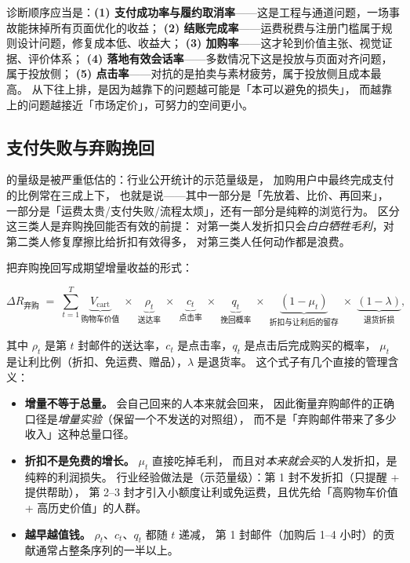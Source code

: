 \begin{keypoint}
诊断顺序应当是：\textbf{(1) 支付成功率与履约取消率}——这是工程与通道问题，一场事故能抹掉所有页面优化的收益；
\textbf{(2) 结账完成率}——运费税费与注册门槛属于规则设计问题，修复成本低、收益大；
\textbf{(3) 加购率}——这才轮到价值主张、视觉证据、评价体系；
\textbf{(4) 落地有效会话率}——多数情况下这是投放与页面对齐问题，属于投放侧；
\textbf{(5) 点击率}——对抗的是拍卖与素材疲劳，属于投放侧且成本最高。
从下往上排，是因为越靠下的问题越可能是「本可以避免的损失」，
而越靠上的问题越接近「市场定价」，可努力的空间更小。
\end{keypoint}

\subsection{支付失败与弃购挽回}

 的量级是被严重低估的：行业公开统计的示范量级是，
加购用户中最终完成支付的比例常在三成上下，
也就是说——其中一部分是「先放着、比价、再回来」，
一部分是「运费太贵/支付失败/流程太烦」，还有一部分是纯粹的浏览行为。
区分这三类人是弃购挽回能否有效的前提：
对第一类人发折扣只会\emph{白白牺牲毛利}，对第二类人修复摩擦比给折扣有效得多，
对第三类人任何动作都是浪费。

把弃购挽回写成期望增量收益的形式：

\begin{equation}
\Delta R_{\text{弃购}} \;=\; \sum_{t=1}^{T} \underbrace{V_{\text{cart}}}_{\text{购物车价值}}
\;\times\; \underbrace{\rho_t}_{\text{送达率}} \;\times\; \underbrace{c_t}_{\text{点击率}}
\;\times\; \underbrace{q_t}_{\text{挽回概率}} \;\times\; \underbrace{(1 - \mu_t)}_{\text{折扣与让利后的留存}}
\;\times\; \underbrace{(1 - \lambda)}_{\text{退货折损}} ,
\label{eq:abandon-incremental}
\end{equation}

其中 $\rho_t$ 是第 $t$ 封邮件的送达率，$c_t$ 是点击率，$q_t$ 是点击后完成购买的概率，
$\mu_t$ 是让利比例（折扣、免运费、赠品），$\lambda$ 是退货率。
这个式子有几个直接的管理含义：

\begin{itemize}
  \item \textbf{增量不等于总量。} 会自己回来的人本来就会回来，
        因此衡量弃购邮件的正确口径是\emph{增量实验}（保留一个不发送的对照组），
        而不是「弃购邮件带来了多少收入」这种总量口径。
  \item \textbf{折扣不是免费的增长。} $\mu_t$ 直接吃掉毛利，
        而且对\emph{本来就会买}的人发折扣，是纯粹的利润损失。
        行业经验做法是（示范量级）：第 1 封不发折扣（只提醒 + 提供帮助），
        第 2--3 封才引入小额度让利或免运费，且优先给「高购物车价值 + 高历史价值」的人群。
  \item \textbf{越早越值钱。} $\rho_t$、$c_t$、$q_t$ 都随 $t$ 递减，
        第 1 封邮件（加购后 1--4 小时）的贡献通常占整条序列的一半以上。
\end{itemize}

